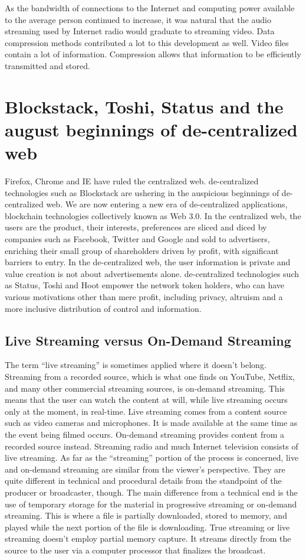 \documentclass{article}
\begin{document}
As the bandwidth of connections to the Internet and computing power available to the average person continued to increase, it was natural that the audio streaming used by Internet radio would graduate to streaming video. Data compression methods contributed a lot to this development as well. Video files contain a lot of information. Compression allows that information to be efficiently transmitted and stored.


\section{Blockstack, Toshi, Status and the august beginnings of de-centralized
  web}
 Firefox, Chrome and IE have ruled the centralized web. de-centralized technologies
such as Blockstack are ushering in the auspicious beginnings of
de-centralized web. 
 We are now entering a new era of de-centralized applications, blockchain technologies collectively known as Web 3.0. In the centralized web, the users are the product,
their interests, preferences are sliced and diced by companies such as
Facebook, Twitter and Google and sold to advertisers, enriching their
small group of shareholders driven by profit, with significant barriers to entry. In the
de-centralized web, the user information is private and value creation is not about advertisements alone. de-centralized
technologies such as Status, Toshi and Hoot empower the network token
holders, who can have various motivations other than mere profit,
including privacy, altruism and a more inclusive distribution of
control and information.


\subsection{Live Streaming versus On-Demand Streaming}
The term “live streaming” is sometimes applied where it doesn’t belong. Streaming from a recorded source, which is what one finds on YouTube, Netflix, and many other commercial streaming sources, is on-demand streaming. This means that the user can watch the content at will, while live streaming occurs only at the moment, in real-time. Live streaming comes from a content source such as video cameras and microphones. It is made available at the same time as the event being filmed occurs. On-demand streaming provides content from a recorded source instead. Streaming radio and much Internet television consists of live streaming.
As far as the “streaming” portion of the process is concerned, live and on-demand streaming are similar from the viewer’s perspective. They are quite different in technical and procedural details from the standpoint of the producer or broadcaster, though. The main difference from a technical end is the use of temporary storage for the material in progressive streaming or on-demand streaming. This is where a file is partially downloaded, stored to memory, and played while the next portion of the file is downloading. True streaming or live streaming doesn’t employ partial memory capture. It streams directly from the source to the user via a computer processor that finalizes the broadcast.
\end{document}
